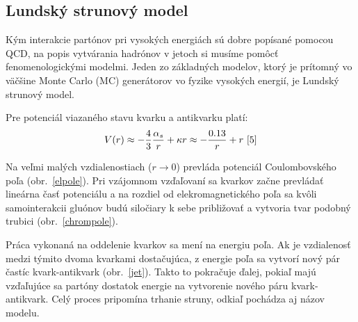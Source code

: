 \documentclass[thesismargins, thesislinespacing]{rnthesis}
\begin{document}
\subsection{Lundský strunový model}
Kým interakcie partónov pri vysokých energiách sú dobre popísané pomocou QCD, na popis vytvárania hadrónov v jetoch si musíme pomôcť fenomenologickými \-mo\-del\-mi. Jeden zo základných modelov, ktorý je prítomný vo väčšine Monte Carlo (MC) generátorov vo fyzike vysokých energií, je Lundský strunový model.

Pre potenciál viazaného stavu kvarku a antikvarku platí:
\begin{equation}
	V(r) \approx - \frac{4}{3} \frac{\alpha_s}{r} + \kappa r \approx - \frac{0.13}{r} + r~\cite{5}
\end{equation}

Na veľmi malých vzdialenostiach ($r\rightarrow0$) prevláda potenciál Coulombovského poľa (obr.~\ref{elpole}). Pri vzájomnom vzďaľovaní sa kvarkov začne prevládať lineárna časť potenciálu a na rozdiel od elekromagnetického poľa sa kvôli samointerakcii gluónov budú siločiary k sebe približovať a vytvoria tvar podobný trubici (obr.~\ref{chrompole}).

Práca vykonaná na oddelenie kvarkov sa mení na energiu poľa. Ak je vzdialenosť medzi týmito dvoma kvarkami dostačujúca, z energie poľa sa vytvorí nový pár častíc kvark-antikvark (obr.~\ref{jet}). Takto to pokračuje ďalej, pokiaľ majú vzďaľujúce sa partóny dostatok energie na vytvorenie nového páru kvark-antikvark. Celý proces pripomína trhanie struny, odkiaľ pochádza aj názov modelu.
\end{document}
